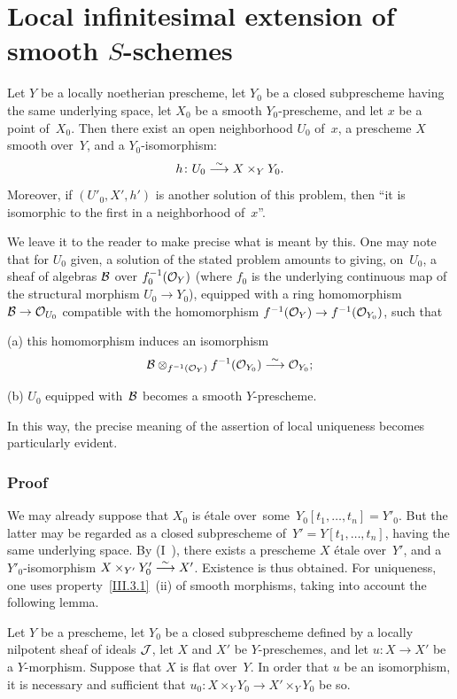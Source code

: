 \section{Local infinitesimal extension of smooth $S$-schemes}
\label{III.4}

\begin{theorem}
\label{III.4.1}
Let $Y$ be a locally noetherian prescheme, let $Y_0$ be a closed
subprescheme having the same underlying space, let $X_0$ be a smooth
$Y_0$-prescheme, and let $x$ be a point of~$X_0$. Then there exist an
open neighborhood $U_0$ of~$x$, a prescheme $X$ smooth over~$Y$, and a
$Y_0$-isomorphism:
$$
h\colon U_0\isomto X\times_Y Y_0.
$$
Moreover, if $(U'_0,X',h')$ is another solution of this problem, then
``it is isomorphic to the first in a neighborhood of~$x$''.
\end{theorem}

We leave it to the reader to make precise what is meant by this. One
may note that for $U_0$ given, a solution of the stated problem
amounts to giving, on~$U_0$, a sheaf of algebras $\cal{B}$ over
$f_0^{-1}(\cal{O}_Y)$ (where $f_0$ is the underlying continuous map
of the structural morphism $U_0\to Y_0$), equipped with a ring
homomorphism $\cal{B}\to \cal{O}_{U_0}$ compatible with the
homomorphism $f^{-1}(\cal{O}_Y)\to f^{-1}(\cal{O}_{Y_0})$, such that

(a) this homomorphism induces an isomorphism
$$
\cal{B}\otimes_{f^{-1}(\cal{O}_Y)} f^{-1}(\cal{O}_{Y_0})\isomto
\cal{O}_{Y_0};
$$

(b) $U_0$ equipped with~$\cal{B}$ becomes a smooth $Y$-prescheme.

In this way, the precise meaning of the assertion of local uniqueness
becomes particularly evident.

\subsubsection*{Proof} We may already suppose that $X_0$ is
\'etale \hbox{over some $Y_0[t_1,\dots,t_n]=Y'_0$}. But the latter
may be regarded as a closed subprescheme of~$Y'=Y[t_1,\dots,t_n]$,
having the same underlying space. By (I~), there
exists a prescheme $X$ \'etale over~$Y'$, and a $Y'_0$-isomorphism
$X\times_{Y'}Y'_0\isomto X'$. Existence is thus obtained. For
uniqueness, one uses property~\ref{III.3.1}~(ii) of smooth morphisms,
taking into account the following lemma.

\begin{lemma}
\label{III.4.2}
Let $Y$ be a prescheme, let $Y_0$ be a closed subprescheme defined by
a locally nilpotent sheaf of ideals $\cal{J}$, let $X$ and $X'$ be
$Y$-preschemes, and let $u\colon X\to X'$ be a $Y$-morphism. Suppose
that $X$ is flat over~$Y$. In order that $u$ be an isomorphism, it is
necessary and sufficient that $u_0\colon X\times_Y Y_0\to
X'\times_Y Y_0$ be so.
\end{lemma}

